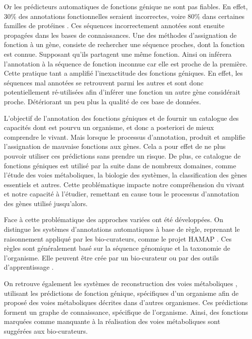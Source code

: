 Or les prédicteurs automatiques de fonctions génique ne sont pas fiables. En effet, 30\% des annotations fonctionnelles seraient incorrectes, voire 80\% dans certaines familles de protéines \parencites{devos2001intrinsic}{schnoes2009annotation}. Ces séquences incorrectement annotées sont ensuite propagées dans les bases de connaissances. Une des méthodes d'assignation de fonction à un gène, consiste de rechercher une séquence proches, dont la fonction est connue. Supposant qu'ils partagent une même fonction. Ainsi on inférera l'annotation à la séquence de fonction inconnue car elle est proche de la première. Cette pratique tant a amplifié l'inexactitude des fonctions géniques. En effet, les séquences mal annotées se retrouvent parmi les autres et sont donc potentiellement ré-utilisées  afin d'inférer une fonction un autre gène considérait proche. Détériorant un peu plus la qualité de ces base de données.

L'objectif de l'annotation des fonctions géniques et de fournir un catalogue des capacités dont est pourvu un organisme, et donc a posteriori de mieux comprendre le vivant. Mais lorsque le processus d'annotation, produit et amplifie l'assignation de mauvaise fonctions aux gènes. Cela a pour effet de ne plus pouvoir utiliser ces prédictions sans prendre un risque. De plus, ce catalogue de fonctions géniques est utilisé par la suite dans de nombreux domaines, comme l'étude des voies métaboliques, la biologie des systèmes, la classification des gènes essentiels et autres. Cette problématique impacte notre compréhension du vivant et notre capacité à l'étudier, remettant en cause tous le processus d'annotation des gènes utilisé jusqu'alors.

Face à cette problématique des approches variées ont été développées. On distingue les systèmes d'annotations automatiques à base de règle, reprenant le raisonnement appliqué par les bio-curateurs, comme le projet HAMAP \cite{lima2009hamap}. Ces règles sont généralement basé sur la séquence génomique et la taxonomie de l'organisme. Elle peuvent être crée par un bio-curateur ou par des outils d'apprentissage \cite{uniprot2011ongoing}.

On retrouve également les systèmes de reconstruction des voies métaboliques \cite{karpe2011pathway}, utilisant les prédictions de fonction génique, spécifiques d'un organisme afin de proposé des voies métaboliques décrites dans d'autres organismes. Ces prédictions forment un graphe de connaissance, spécifique de l'organisme. Ainsi, des fonctions marquées comme manquante à la réalisation des voies métaboliques sont suggérées aux bio-curateurs.

